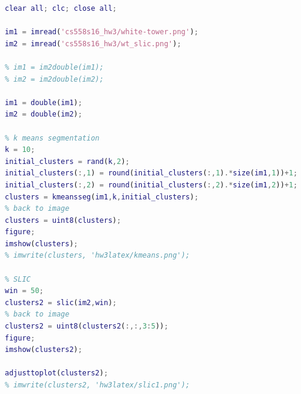 \documentclass{article}
\begin{document}
\begin{lstlisting}[language=Matlab]
clear all; clc; close all;

im1 = imread('cs558s16_hw3/white-tower.png');
im2 = imread('cs558s16_hw3/wt_slic.png');

% im1 = im2double(im1);
% im2 = im2double(im2);

im1 = double(im1);
im2 = double(im2);

% k means segmentation
k = 10;
initial_clusters = rand(k,2);
initial_clusters(:,1) = round(initial_clusters(:,1).*size(im1,1))+1;
initial_clusters(:,2) = round(initial_clusters(:,2).*size(im1,2))+1;
clusters = kmeansseg(im1,k,initial_clusters);
% back to image
clusters = uint8(clusters);
figure;
imshow(clusters);
% imwrite(clusters, 'hw3latex/kmeans.png');

% SLIC
win = 50;
clusters2 = slic(im2,win);
% back to image
clusters2 = uint8(clusters2(:,:,3:5));
figure;
imshow(clusters2);

adjusttoplot(clusters2);
% imwrite(clusters2, 'hw3latex/slic1.png');


\end{lstlisting}
\end{document}
